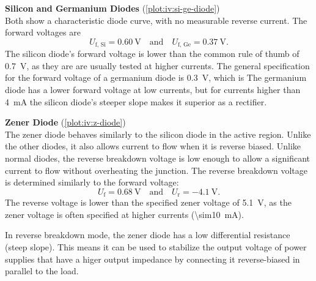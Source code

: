 \textbf{Silicon and Germanium Diodes} (\autoref{plot:iv:si-ge-diode})\\
Both show a characteristic diode curve, with no measurable reverse current.
The forward voltages are
\begin{equation*}
	U_\text{f, Si} = \SI{0.60}{\volt} \quad \text{and} \quad U_\text{f, Ge} = \SI{0.37}{\volt}.
\end{equation*}
The silicon diode's forward voltage is lower than the common rule of thumb of \SI{0.7}{\volt}, as they are are usually tested at higher currents.
The general specification for the forward voltage of a germanium diode is \SI{0.3}{\volt}, which is
The germanium diode has a lower forward voltage at low currents, but for currents higher than \SI{4}{\mA} the silicon diode's steeper slope makes it superior as a rectifier.

\textbf{Zener Diode} (\autoref{plot:iv:z-diode})\\
The zener diode behaves similarly to the silicon diode in the active region.
Unlike the other diodes, it also allows current to flow when it is reverse biased.
Unlike normal diodes, the reverse breakdown voltage is low enough to allow a significant current to flow without overheating the junction.
The reverse breakdown voltage is determined similarly to the forward voltage:
\begin{equation*}
	U_\text{f} = \SI{0.68}{\volt} \quad \text{and} \quad U_\text{r} = \SI{-4.1}{\volt}.
\end{equation*}
The reverse voltage is lower than the specified zener voltage of \SI{5.1}{\volt}, as the zener voltage is often specified at higher currents (\SI{\sim10}{\mA}).

In reverse breakdown mode, the zener diode has a low differential resistance (steep slope).
This means it can be used to stabilize the output voltage of power supplies that have a higer output impedance by connecting it reverse-biased in parallel to the load.

